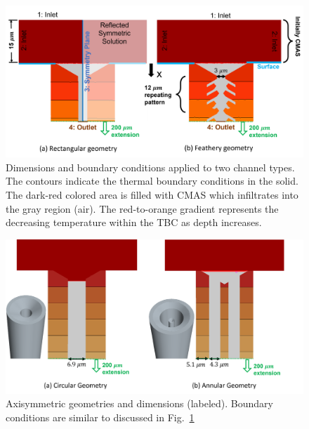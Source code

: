 \documentclass[%
 aip,
 amsmath,amssymb,
 reprint,%
]{revtex4-1}
\begin{document}
\begin{figure}
    \centering
    \includegraphics[width=0.9\linewidth]{Figures/dimensionsTwoView.png}
    \caption{Dimensions and boundary conditions applied to two channel types. The contours indicate the thermal boundary conditions in the solid. The dark-red colored area is filled with CMAS which infiltrates into the gray region (air). The red-to-orange gradient represents the decreasing temperature within the TBC as depth increases.}
    \label{fig:dimensions}
\end{figure}

\begin{figure}
    \centering
    \includegraphics[width=0.9\linewidth]{Figures/3d_geometries.png}
    \caption{Axisymmetric geometries and dimensions (labeled). Boundary conditions are similar to discussed in Fig.~\ref{fig:dimensions}}
    \label{fig:3D_Geometries}
\end{figure}
\end{document}
